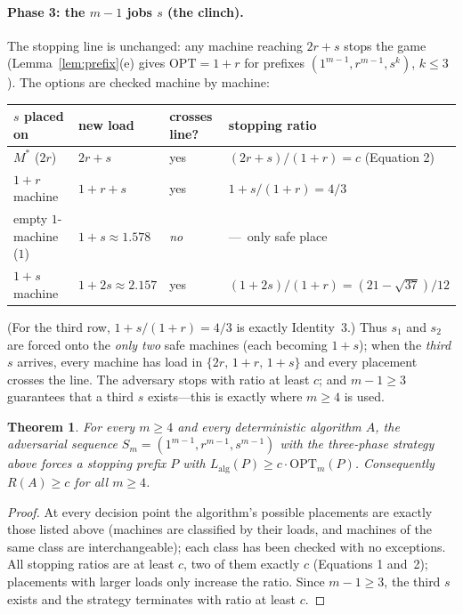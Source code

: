 \documentclass[11pt]{article}
\newtheorem{theorem}{Theorem}
\theoremstyle{definition}
\newcommand{\opt}{\mathrm{OPT}}
\newcommand{\alg}{\mathrm{alg}}
\begin{document}
\paragraph{Phase 3: the $m-1$ jobs $s$ (the clinch).}
The stopping line is unchanged: any machine reaching $2r+s$ stops the game
(Lemma~\ref{lem:prefix}(e) gives $\opt=1+r$ for prefixes
$(1^{m-1},r^{m-1},s^{k})$, $k\le3$). The options are checked machine by
machine:
\begin{center}
\scriptsize
\begin{tabular}{@{}llll@{}}
\toprule
$s$ placed on & new load & crosses line? & stopping ratio \\
\midrule
$M^{*}$ ($2r$) & $2r+s$ & yes & $(2r+s)/(1+r)=c$ (Equation 2) \\
$1+r$ machine & $1+r+s$ & yes & $1+s/(1+r)=4/3$ \\
empty $1$-machine ($1$) & $1+s\approx1.578$ & \emph{no} & ---\ only safe place \\
$1+s$ machine & $1+2s\approx2.157$ & yes & $(1+2s)/(1+r)=(21-\sqrt{37})/12$ \\
\bottomrule
\end{tabular}
\end{center}
(For the third row, $1+s/(1+r)=4/3$ is exactly Identity~3.) Thus $s_{1}$ and
$s_{2}$ are forced onto the \emph{only two} safe machines (each becoming
$1+s$); when the \emph{third} $s$ arrives, every machine has load in
$\{2r,\,1+r,\,1+s\}$ and every placement crosses the line. The adversary
stops with ratio at least $c$; and $m-1\ge3$ guarantees that a third $s$
exists---this is exactly where $m\ge4$ is used.

\begin{theorem}
\label{thm:explicit}
For every $m\ge4$ and every deterministic algorithm $A$, the adversarial
sequence $S_{m}=(1^{m-1},r^{m-1},s^{m-1})$ with the three-phase strategy
above forces a stopping prefix $P$ with
$L_{\alg}(P)\ge c\cdot\opt_{m}(P)$. Consequently $R(A)\ge c$ for all
$m\ge4$.
\end{theorem}
\begin{proof}
At every decision point the algorithm's possible placements are exactly
those listed above (machines are classified by their loads, and machines of
the same class are interchangeable); each class has been checked with no
exceptions. All stopping ratios are at least $c$, two of them exactly $c$
(Equations 1 and~2); placements with larger loads only increase the ratio.
Since $m-1\ge3$, the third $s$ exists and the strategy terminates with
ratio at least $c$.
\end{proof}
\end{document}
